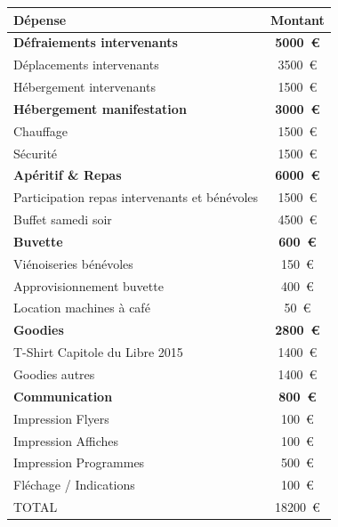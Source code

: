 \begin{center}
    \begin{tabular}{|l|c|}
        \hline Dépense & Montant \\
        \hline \textbf{Défraiements intervenants} & \textbf{\SI{5000}{\euro}} \\
        \hline Déplacements intervenants & \SI{3500}{\euro} \\
        \hline Hébergement intervenants & \SI{1500}{\euro} \\
        \hline \textbf{Hébergement manifestation} & \textbf{\SI{3000}{\euro}}\\
        \hline Chauffage & \SI{1500}{\euro} \\
        \hline Sécurité & \SI{1500}{\euro} \\
        \hline \textbf{Apéritif \& Repas} & \textbf{\SI{6000}{\euro}}\\
        \hline Participation repas intervenants et bénévoles & \SI{1500}{\euro} \\
        \hline Buffet samedi soir & \SI{4500}{\euro} \\
        \hline \textbf{Buvette} & \textbf{\SI{600}{\euro}}\\
        \hline Viénoiseries bénévoles & \SI{150}{\euro} \\
        \hline Approvisionnement buvette & \SI{400}{\euro} \\
        \hline Location machines à café & \SI{50}{\euro} \\
        \hline \textbf{Goodies} & \textbf{\SI{2800}{\euro} }\\
        \hline T-Shirt Capitole du Libre 2015 & \SI{1400}{\euro} \\
        \hline Goodies autres & \SI{1400}{\euro} \\
        \hline \textbf{Communication} & \textbf{\SI{800}{\euro}} \\
        \hline Impression Flyers & \SI{100}{\euro} \\
        \hline Impression Affiches & \SI{100}{\euro} \\
        \hline Impression Programmes & \SI{500}{\euro} \\
        \hline Fléchage / Indications & \SI{100}{\euro} \\
        \hline
        \hline TOTAL & \SI{18200}{\euro} \\
        \hline
    \end{tabular}
\end{center}

